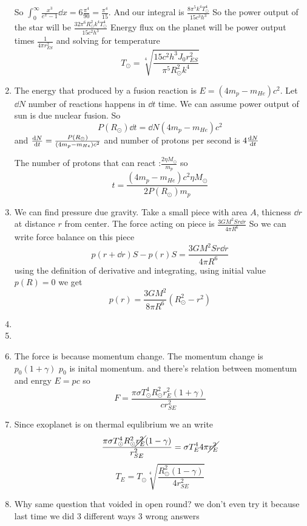 \begin{sol}
\begin{enumerate}[label=\textbf{(\alph*)}]
        So $\int_0^\infty\frac{x^3}{e^x-1}\dd x=6\frac{\pi^4}{90}=\frac{\pi^4}{15}$. And our integral is $\frac{8\pi^5 k^4T_\odot^4}{15c^3h^3}$ So the power output of the star will be $\frac{32\pi^6 R_\odot^2 k^4T_\odot^4}{15c^2h^3}$
        Energy flux on the planet will be power output times $\frac{1}{4\pi r_{ES}^2}$ and solving for temperature $$T_\odot=\sqrt[4]{\frac{15c^2h^3J_0r_{ES}^2}{\pi^5R_\odot^2k^4}}$$
        \item 
        The energy that produced by a fusion reaction is $E=(4m_p-m_{He})c^2$. Let $\dd N$ number of reactions happens in $\dd t$ time. We can assume power output of sun is due nuclear fusion. So 
        $$P(R_\odot)\dd t=\dd N(4m_p-m_{He})c^2$$ and $\dv{N}{t}=\frac{P(R_\odot)}{(4m_p-m_{He})c^2}$ and number of protons per second is $4\dv{N}{t}$

        The number of protons that can react :$\frac{2\eta M_\odot}{m_p}$ so $$t=\frac{(4m_p-m_{He})c^2\eta M_\odot}{2P(R_\odot) m_p}$$
        \item 
        We can find pressure due gravity. Take a small piece with area $A$, thicness $\dd r$ at distance $r$ from center. The force acting on piece is
        $\frac{3GM^2Sr\dd r}{4\pi R^6}$ So we can write force balance on this piece $$p(r+\dd r)S-p(r)S=\frac{3GM^2Sr\dd r}{4\pi R^6}$$
        using the definition of derivative and integrating, using  initial value $p(R)=0$ we get $$p(r)=\frac{3GM^2}{8\pi R^6}(R_\odot^2-r^2)$$

        \item 
        \item 
        \item 
        The force is because momentum change. The momentum change is $p_0(1+\gamma)$ $p_0$ is inital momentum. and there's relation between momentum and enrgy $E=pc$ so  $$F=\frac{\pi\sigma T_\odot^4 R_\odot^2 r_E^2(1+\gamma)}{cr_{SE}^2}$$
        \item 
        Since exoplanet is on thermal equlibrium we an write
        $$\frac{\pi\sigma T_\odot^4 R_\odot^2 \cancel{r_E^2}(1-\gamma)}{r_{SE}^2}=\sigma T_E^4 4\pi \cancel{r_E^2}$$
        $$T_E=T_\odot\sqrt[4]{\frac{R_\odot^2(1-\gamma)}{4r_{SE}^2}}$$
        \item 
        Why same question that voided in open round? we don't even try it because last time we did 3 different ways 3 wrong answers
    \end{enumerate}
\vspace{15mm}
\end{sol}